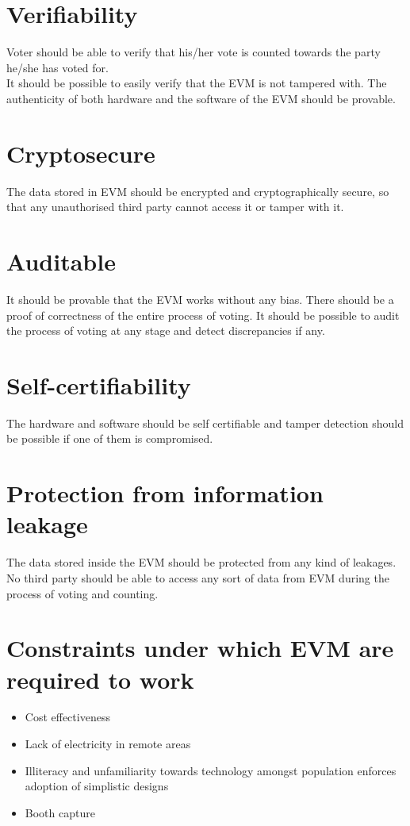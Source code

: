 \documentclass[a4paper,12pt,openany]{book}
\begin{document}
\section{Verifiability}
Voter should be able to verify that his/her vote is counted towards the party he/she has voted for.\\
It should be possible to easily verify that the EVM is not tampered with. The authenticity of both hardware and the software of the EVM should be provable.

\section{Cryptosecure}
The data stored in EVM should be encrypted and cryptographically secure, so that any unauthorised third party cannot access it or tamper with it.

\section{Auditable}
It should be provable that the EVM works without any bias. There should be a proof of correctness of the entire process of voting. It should be possible to audit the process of voting at any stage and detect discrepancies if any.

\section{Self-certifiability}
The hardware and software should be self certifiable and tamper detection should be possible if one of them is compromised.

\section{Protection from information leakage}
The data stored inside the EVM should be protected from any kind of leakages. No third party should be able to access any sort of data from EVM during the process of voting and counting.

\section{Constraints under which EVM are required to work}


\begin{itemize}
\item Cost effectiveness
\item Lack of electricity in remote areas
\item Illiteracy and unfamiliarity towards technology amongst population enforces adoption of simplistic designs
\item Booth capture
\end{itemize}
\end{document}
